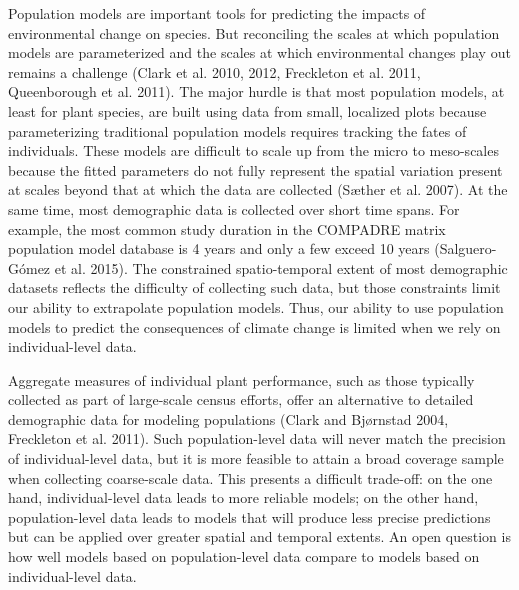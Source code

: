 \documentclass[12pt,]{article}
\begin{document}
Population models are important tools for predicting the impacts of
environmental change on species. But reconciling the scales at which
population models are parameterized and the scales at which
environmental changes play out remains a challenge (Clark et al. 2010,
2012, Freckleton et al. 2011, Queenborough et al. 2011). The major
hurdle is that most population models, at least for plant species, are
built using data from small, localized plots because parameterizing
traditional population models requires tracking the fates of
individuals. These models are difficult to scale up from the micro to
meso-scales because the fitted parameters do not fully represent the
spatial variation present at scales beyond that at which the data are
collected (Sæther et al. 2007). At the same time, most demographic data
is collected over short time spans. For example, the most common study
duration in the COMPADRE matrix population model database is 4 years and
only a few exceed 10 years (Salguero-Gómez et al. 2015). The constrained
spatio-temporal extent of most demographic datasets reflects the
difficulty of collecting such data, but those constraints limit our
ability to extrapolate population models. Thus, our ability to use
population models to predict the consequences of climate change is
limited when we rely on individual-level data.

Aggregate measures of individual plant performance, such as those
typically collected as part of large-scale census efforts, offer an
alternative to detailed demographic data for modeling populations (Clark
and Bjørnstad 2004, Freckleton et al. 2011). Such population-level data
will never match the precision of individual-level data, but it is more
feasible to attain a broad coverage sample when collecting coarse-scale
data. This presents a difficult trade-off: on the one hand,
individual-level data leads to more reliable models; on the other hand,
population-level data leads to models that will produce less precise
predictions but can be applied over greater spatial and temporal
extents. An open question is how well models based on population-level
data compare to models based on individual-level data.
\end{document}
